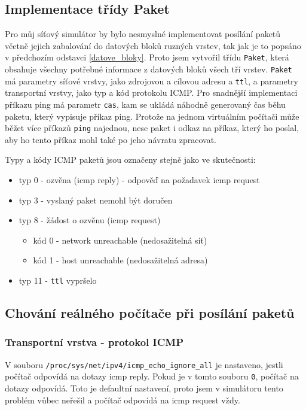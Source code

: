 \subsection{Implementace třídy Paket}
Pro můj síťový simulátor by bylo nesmyslné implementovat posílání paketů včetně jejich zabalování do datových bloků ruzných vrstev, tak jak je to popsáno v předchozím odstavci \ref{datove_bloky}. Proto jsem vytvořil třídu \verb|Paket|, která obsahuje všechny potřebné informace z datových bloků všech tří vrstev. \verb|Paket| má parametry síťové vrstvy, jako zdrojovou a cílovou adresu a \verb|ttl|, a parametry transportní vrstvy, jako typ a kód protokolu ICMP. Pro snadnější implementaci příkazu ping má parametr \verb|cas|, kam se ukládá náhodně generovaný čas běhu paketu, který vypisuje příkaz ping. Protože na jednom virtuálním počítači může běžet více příkazů \verb|ping| najednou, nese paket i odkaz na příkaz, který ho poslal, aby ho tento příkaz mohl také po jeho návratu zpracovat.

Typy a kódy ICMP paketů jsou označeny stejně jako ve skutečnosti:
\begin{itemize}
\item typ 0 - ozvěna (icmp reply) - odpověď na požadavek icmp request
\item typ 3 - vyslaný paket nemohl být doručen
\item typ 8 - žádost o ozvěnu (icmp request)
\begin{itemize}
\item kód 0 - network unreachable (nedosažitelná síť)
\item kód 1 - host unreachable (nedosažitelná adresa)
\end{itemize}
\item typ 11 - \verb|ttl| vypršelo
\end{itemize}


\subsection{Chování reálného počítače při posílání paketů}

\subsubsection{Transportní vrstva - protokol ICMP}

V souboru \verb|/proc/sys/net/ipv4/icmp_echo_ignore_all| je nastaveno, jestli počítač odpovídá na dotazy icmp reply. Pokud je v tomto souboru \verb|0|, počítač na dotazy odpovídá. Toto je defaultní nastavení, proto jsem v simulátoru tento problém vůbec neřešil a počítač odpovídá na icmp request vždy.

